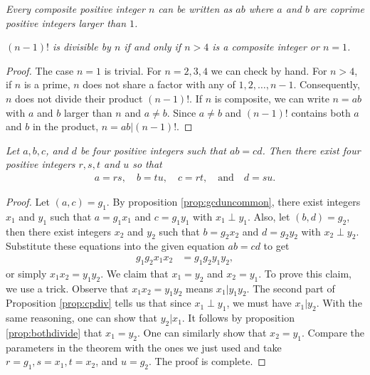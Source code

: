 \documentclass{subfile}
\begin{document}
	\begin{theorem}\slshape
		Every composite positive integer $n$ can be written as $ab$ where $a$ and $b$ are coprime positive integers larger than $1$.
	\end{theorem}

	\begin{theorem}\slshape
		$(n-1)!$ is divisible by $n$ if and only if $n>4$ is a composite integer or $n=1$.\label{thm:cpfct}
	\end{theorem}

	\begin{proof}
		The case $n=1$ is trivial. For $n=2,3,4$ we can check by hand. For $n>4$, if $n$ is a prime, $n$ does not share a factor with any of $1,2,\dots,n-1$. Consequently, $n$ does not divide their product $(n-1)!$. If $n$ is composite, we can write $n=ab$ with $a$ and $b$ larger than $n$ and $a\neq b$. Since $a\neq b$ and $(n-1)!$ contains both $a$ and $b$ in the product, $n=ab|(n-1)!$.
	\end{proof}

	\begin{theorem}\slshape
		Let $a, b, c$, and $d$ be four positive integers such that $ab=cd$. Then there exist four positive integers $r,s,t$ and $u$ so that
		\begin{align*}
			a = rs, \quad b = tu, \quad	c = rt, \quad \text{and}\quad d = su.
		\end{align*}
	\end{theorem}

	\begin{proof}
		Let $(a,c)=g_1$. By proposition \eqref{prop:gcduncommon}, there exist integers $x_1$ and $y_1$ such that $a=g_1x_1$ and $c=g_1y_1$ with $x_1\perp y_1$. Also, let $(b,d)=g_2$, then there exist integers $x_2$ and $y_2$ such that $b=g_2x_2$ and $d=g_2y_2$ with $x_2\perp y_2$. Substitute these equations into the given equation $ab=cd$ to get
		\begin{align*}
			g_1g_2x_1x_2 & =g_1g_2y_1y_2,
		\end{align*}
		or simply $x_1x_2 =y_1y_2$. We claim that $x_1=y_2$ and $x_2=y_1$. To prove this claim, we use a trick. Observe that $x_1x_2=y_1y_2$ means $x_1 | y_1y_2$. The second part of Proposition \eqref{prop:cpdiv} tells us that since $x_1 \perp y_1$, we must have $x_1 | y_2$. With the same reasoning, one can show that $y_2|x_1$. It follows by proposition \eqref{prop:bothdivide} that $x_1 =y_2$. One can similarly show that $x_2=y_1$. Compare the  parameters in the theorem with the ones we just used and take $r=g_1, s=x_1, t=x_2 $, and $u=g_2$. The proof is complete.
	\end{proof}
\end{document}
